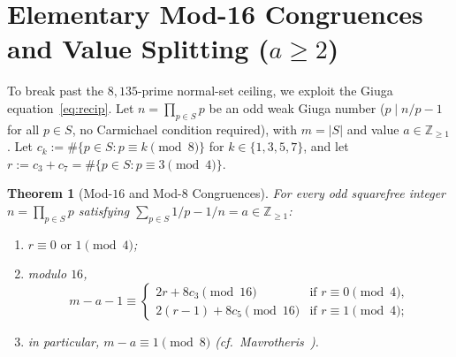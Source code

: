 \documentclass[11pt]{article}
\newtheorem{theorem}{Theorem}[section]
\theoremstyle{remark}
\begin{document}
\section{Elementary Mod-16 Congruences and Value Splitting (\texorpdfstring{$a \ge 2$}{a >= 2})}
\label{sec:elementary}

To break past the $8{,}135$-prime normal-set ceiling, we exploit the Giuga
equation~\eqref{eq:recip}. Let $n = \prod_{p\in S} p$ be an odd weak Giuga
number ($p \mid n/p - 1$ for all $p \in S$, no Carmichael condition required),
with $m = |S|$ and value $a \in \mathbb{Z}_{\ge 1}$. Let
$c_k := \#\{p \in S : p \equiv k \pmod 8\}$ for $k \in \{1,3,5,7\}$, and let
$r := c_3 + c_7 = \#\{p \in S : p \equiv 3 \pmod 4\}$.

\begin{theorem}[Mod-$16$ and Mod-$8$ Congruences]\label{thm:mod16}
For every odd squarefree integer $n = \prod_{p\in S} p$ satisfying
$\sum_{p\in S} 1/p - 1/n = a \in \mathbb{Z}_{\ge 1}$:
\begin{enumerate}
  \item $r \equiv 0 \text{ or } 1 \pmod 4$;
  \item modulo $16$,
  \[
    m - a - 1 \equiv
    \begin{cases}
      2r + 8c_3 \pmod{16} & \text{if } r \equiv 0 \pmod 4,\\
      2(r - 1) + 8c_5 \pmod{16} & \text{if } r \equiv 1 \pmod 4;
    \end{cases}
  \]
  \item in particular, $m - a \equiv 1 \pmod 8$ (cf.\ Mavrotheris~\cite{Mavrotheris2026}).
\end{enumerate}
\end{theorem}
\end{document}

